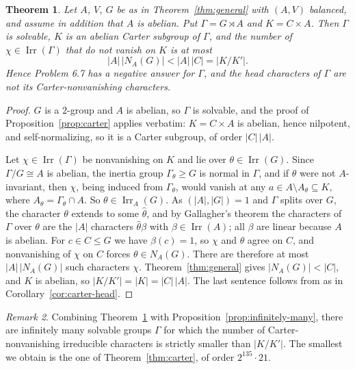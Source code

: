 \documentclass[11pt,a4paper,reqno]{amsart}
\newtheorem{theorem}{Theorem}[section]
\theoremstyle{definition}
\theoremstyle{remark}
\newtheorem{remark}[theorem]{Remark}
\newcommand{\Irr}{\operatorname{Irr}}
\begin{document}
\begin{theorem}\label{thm:carter-general}
Let $A$, $V$, $G$ be as in Theorem~\ref{thm:general} with $(A,V)$
balanced, and assume in addition that $A$ is abelian.  Put
$\Gamma=G\rtimes A$ and $K=C\times A$.  Then $\Gamma$ is solvable, $K$
is an abelian Carter subgroup of $\Gamma$, and the number of
$\chi\in\Irr(\Gamma)$ that do not vanish on $K$ is at most
\[
 |A|\,|N_A(G)|<|A|\,|C|=|K/K'| .
\]
Hence Problem 6.7 has a negative answer for $\Gamma$, and the head
characters of $\Gamma$ are not its Carter-nonvanishing characters.
\end{theorem}

\begin{proof}
$G$ is a $2$-group and $A$ is abelian, so $\Gamma$ is solvable, and the
proof of Proposition~\ref{prop:carter} applies verbatim: $K=C\times A$
is abelian, hence nilpotent, and self-normalizing, so it is a Carter
subgroup, of order $|C|\,|A|$.

Let $\chi\in\Irr(\Gamma)$ be nonvanishing on $K$ and lie over
$\theta\in\Irr(G)$.  Since $\Gamma/G\cong A$ is abelian, the inertia
group $\Gamma_\theta\ge G$ is normal in $\Gamma$, and if $\theta$ were
not $A$-invariant, then $\chi$, being induced from $\Gamma_\theta$,
would vanish at any $a\in A\setminus A_\theta\subseteq K$, where
$A_\theta=\Gamma_\theta\cap A$.  So $\theta\in\Irr_A(G)$.  As
$(|A|,|G|)=1$ and $\Gamma$ splits over $G$, the character $\theta$
extends to some $\hat\theta$, and by Gallagher's theorem the characters
of $\Gamma$ over $\theta$ are the $|A|$ characters $\hat\theta\beta$
with $\beta\in\Irr(A)$; all $\beta$ are linear because $A$ is abelian.
For $c\in C\le G$ we have $\beta(c)=1$, so $\chi$ and $\theta$ agree on
$C$, and nonvanishing of $\chi$ on $C$ forces $\theta\in N_A(G)$.
There are therefore at most $|A|\,|N_A(G)|$ such characters
$\chi$.  Theorem~\ref{thm:general} gives $|N_A(G)|<|C|$, and $K$ is
abelian, so $|K/K'|=|K|=|C|\,|A|$.  The last sentence follows from
\cite[Theorem A]{isaacs-carter} as in Corollary~\ref{cor:carter-head}.
\end{proof}

\begin{remark}
Combining Theorem~\ref{thm:carter-general} with
Proposition~\ref{prop:infinitely-many}, there are infinitely many
solvable groups $\Gamma$ for which the number of Carter-nonvanishing
irreducible characters is strictly smaller than $|K/K'|$.  The smallest
we obtain is the one of Theorem~\ref{thm:carter}, of order
$2^{135}\cdot21$.
\end{remark}
\end{document}
